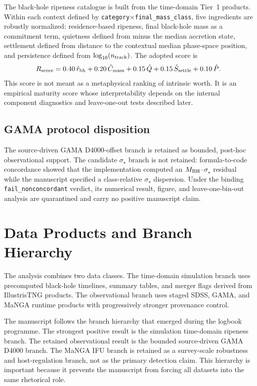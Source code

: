\documentclass[11pt]{article}
\begin{document}
The black-hole ripeness catalogue is built from the time-domain Tier~1 products. Within each context defined by \texttt{category}$\times$\texttt{final\_mass\_class}, five ingredients are robustly normalized: residence-based ripeness, final black-hole mass as a commitment term, quietness defined from minus the median accretion state, settlement defined from distance to the contextual median phase-space position, and persistence defined from $\log_{10}(n_{\rm track})$. The adopted score is
\begin{equation}
R_{\rm score}=0.40\,\hat r_{\rm bh}+0.20\,\hat C_{\rm mass}+0.15\,\hat Q+0.15\,\hat S_{\rm settle}+0.10\,\hat P.
\end{equation}
This score is not meant as a metaphysical ranking of intrinsic worth. It is an empirical maturity score whose interpretability depends on the internal component diagnostics and leave-one-out tests described later.

\subsection{GAMA protocol disposition}

  The source-driven GAMA D4000-offset branch is retained as bounded, post-hoc observational support. The candidate $\sigma_\star$ branch is not retained: formula-to-code concordance showed that the implementation computed an $M_{\rm BH}$--$\sigma_\star$ residual while the manuscript specified a class-relative $\sigma_\star$ dispersion. Under the binding \texttt{fail\_nonconcordant} verdict, its numerical result, figure, and leave-one-bin-out analysis are quarantined and carry no positive manuscript claim.

\section{Data Products and Branch Hierarchy}

The analysis combines two data classes. The time-domain simulation branch uses precomputed black-hole timelines, summary tables, and merger flags derived from IllustrisTNG products. The observational branch uses staged SDSS, GAMA, and MaNGA runtime products with progressively stronger provenance control.

The manuscript follows the branch hierarchy that emerged during the logbook programme. The strongest positive result is the simulation time-domain ripeness branch. The retained observational result is the bounded source-driven GAMA D4000 branch. The MaNGA IFU branch is retained as a survey-scale robustness and host-regulation branch, not as the primary detection claim. This hierarchy is important because it prevents the manuscript from forcing all datasets into the same rhetorical role.
\end{document}
